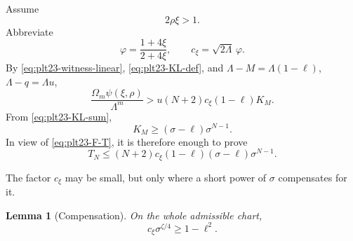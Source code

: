 \documentclass[11pt]{article}
\newtheorem{lemma}[theorem]{Lemma}
\numberwithin{equation}{section}
\begin{document}
Assume
\begin{equation}\label{eq:plt23-linear-branch}
  2\rho\xi>1.
\end{equation}
Abbreviate
\begin{equation}\label{eq:plt23-varphi-cxi}
  \varphi=\frac{1+4\xi}{2+4\xi},
  \qquad
  c_\xi=\sqrt{2\Lambda}\,\varphi.
\end{equation}
By \eqref{eq:plt23-witness-linear}, \eqref{eq:plt23-KL-def}, and $\Lambda-M=\Lambda(1-\ell)$, $\Lambda-q=\Lambda u$,
\begin{equation}\label{eq:plt23-linear-payment-start}
  \frac{\Omega_m\psi(\xi,\rho)}{\Lambda^m}
  >u(N+2)c_\xi(1-\ell)K_M.
\end{equation}
From \eqref{eq:plt23-KL-sum},
\begin{equation}\label{eq:plt23-KL-first-term}
  K_M\ge(\sigma-\ell)\sigma^{N-1}.
\end{equation}
In view of \eqref{eq:plt23-F-T}, it is therefore enough to prove
\begin{equation}\label{eq:plt23-linear-core}
  T_N\le
  (N+2)c_\xi(1-\ell)(\sigma-\ell)\sigma^{N-1}.
\end{equation}

The factor $c_\xi$ may be small, but only where a short power of $\sigma$ compensates for it.

\begin{lemma}[Compensation]\label{lem:plt23-compensation}
  On the whole admissible chart,
  \begin{equation}\label{eq:plt23-compensation}
    c_\xi\sigma^{\zeta/4}\ge1-\ell^2.
  \end{equation}
\end{lemma}
\end{document}
